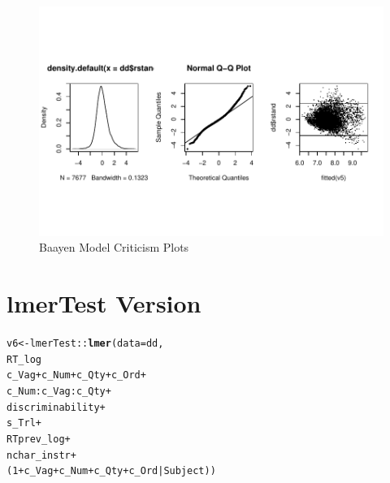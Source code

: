 \documentclass[a4paper,12pt,twoside]{article}\usepackage[]{graphicx}\usepackage[]{color}
\makeatletter
\def\maxwidth{ %
  \ifdim\Gin@nat@width>\linewidth
    \linewidth
  \else
    \Gin@nat@width
  \fi
}
\newcommand{\hlnum}[1]{\textcolor[rgb]{0.686,0.059,0.569}{#1}}%
\newcommand{\hlopt}[1]{\textcolor[rgb]{0,0,0}{#1}}%
\newcommand{\hlstd}[1]{\textcolor[rgb]{0.345,0.345,0.345}{#1}}%
\newcommand{\hlkwb}[1]{\textcolor[rgb]{0.69,0.353,0.396}{#1}}%
\newcommand{\hlkwc}[1]{\textcolor[rgb]{0.333,0.667,0.333}{#1}}%
\newcommand{\hlkwd}[1]{\textcolor[rgb]{0.737,0.353,0.396}{\textbf{#1}}}%
\newenvironment{kframe}{%
 \def\at@end@of@kframe{}%
 \ifinner\ifhmode%
  \def\at@end@of@kframe{\end{minipage}}%
  \begin{minipage}{\columnwidth}%
 \fi\fi%
 \def\FrameCommand##1{\hskip\@totalleftmargin \hskip-\fboxsep
 \colorbox{shadecolor}{##1}\hskip-\fboxsep
     \hskip-\linewidth \hskip-\@totalleftmargin \hskip\columnwidth}%
 \MakeFramed {\advance\hsize-\width
   \@totalleftmargin\z@ \linewidth\hsize
   \@setminipage}}%
 {\par\unskip\endMakeFramed%
 \at@end@of@kframe}
\newenvironment{knitrout}{}{} %
\makeatother
\begin{document}
\begin{knitrout}\scriptsize
{}\color{fgcolor}\begin{figure}[hbtp]

{\centering \includegraphics[width=\maxwidth]{figure/graphics-baayenPLots99-1} 

}

\caption[Baayen Model Criticism Plots]{Baayen Model Criticism Plots}\label{fig:baayenPLots99}
\end{figure}


\end{knitrout}

\clearpage

\section{lmerTest Version}

\begin{knitrout}\scriptsize
{}\color{fgcolor}\begin{kframe}
\begin{alltt}
\hlstd{v6} \hlkwb{<-} \hlstd{lmerTest}\hlopt{::}\hlkwd{lmer}\hlstd{(}\hlkwc{data}\hlstd{=dd,}
                     \hlstd{RT_log} \hlopt{~}
                       \hlstd{c_Vag} \hlopt{+} \hlstd{c_Num} \hlopt{+} \hlstd{c_Qty} \hlopt{+} \hlstd{c_Ord} \hlopt{+}
                       \hlstd{c_Num}\hlopt{:}\hlstd{c_Vag}\hlopt{:}\hlstd{c_Qty} \hlopt{+}
                       \hlstd{discriminability} \hlopt{+}
                       \hlstd{s_Trl} \hlopt{+}
                       \hlstd{RTprev_log} \hlopt{+}
                       \hlstd{nchar_instr} \hlopt{+}
                       \hlstd{(}\hlnum{1}\hlopt{+}\hlstd{c_Vag} \hlopt{+} \hlstd{c_Num} \hlopt{+} \hlstd{c_Qty} \hlopt{+} \hlstd{c_Ord}\hlopt{|}\hlstd{Subject))}
\end{alltt}
\end{kframe}
\end{knitrout}
\end{document}
